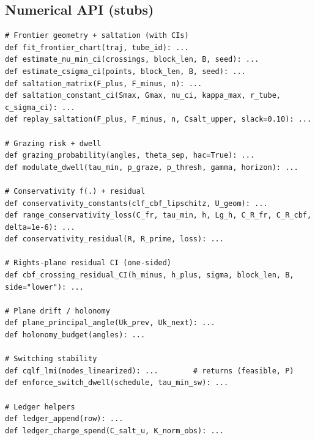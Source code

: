 \subsection*{Numerical API (stubs)}
\begin{lstlisting}
# Frontier geometry + saltation (with CIs)
def fit_frontier_chart(traj, tube_id): ...
def estimate_nu_min_ci(crossings, block_len, B, seed): ...
def estimate_csigma_ci(points, block_len, B, seed): ...
def saltation_matrix(F_plus, F_minus, n): ...
def saltation_constant_ci(Smax, Gmax, nu_ci, kappa_max, r_tube, c_sigma_ci): ...
def replay_saltation(F_plus, F_minus, n, Csalt_upper, slack=0.10): ...

# Grazing risk + dwell
def grazing_probability(angles, theta_sep, hac=True): ...
def modulate_dwell(tau_min, p_graze, p_thresh, gamma, horizon): ...

# Conservativity f(.) + residual
def conservativity_constants(clf_cbf_lipschitz, U_geom): ...
def range_conservativity_loss(C_fr, tau_min, h, Lg_h, C_R_fr, C_R_cbf, delta=1e-6): ...
def conservativity_residual(R, R_prime, loss): ...

# Rights-plane residual CI (one-sided)
def cbf_crossing_residual_CI(h_minus, h_plus, sigma, block_len, B, side="lower"): ...

# Plane drift / holonomy
def plane_principal_angle(Uk_prev, Uk_next): ...
def holonomy_budget(angles): ...

# Switching stability
def cqlf_lmi(modes_linearized): ...        # returns (feasible, P)
def enforce_switch_dwell(schedule, tau_min_sw): ...

# Ledger helpers
def ledger_append(row): ...
def ledger_charge_spend(C_salt_u, K_norm_obs): ...
\end{lstlisting}

